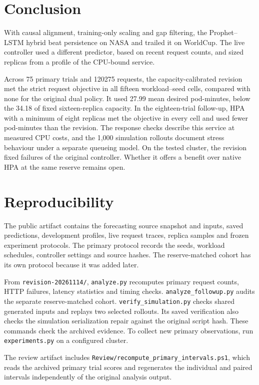 \documentclass[10pt,twocolumn,a4paper]{article}
\begin{document}
\section{Conclusion}
With causal alignment, training-only scaling and gap filtering, the Prophet--LSTM hybrid beat persistence on NASA and trailed it on WorldCup. The live controller used a different predictor, based on recent request counts, and sized replicas from a profile of the CPU-bound service.

Across 75 primary trials and 120275 requests, the capacity-calibrated revision met the strict request objective in all fifteen workload--seed cells, compared with none for the original dual policy. It used 27.99 mean desired pod-minutes, below the 34.18 of fixed sixteen-replica capacity. In the eighteen-trial follow-up, HPA with a minimum of eight replicas met the objective in every cell and used fewer pod-minutes than the revision. The response checks describe this service at measured CPU costs, and the 1,000 simulation rollouts document stress behaviour under a separate queueing model. On the tested cluster, the revision fixed failures of the original controller. Whether it offers a benefit over native HPA at the same reserve remains open.

\appendix
\section{Reproducibility}
The public artifact contains the forecasting source snapshot and inputs, saved predictions, development profiles, live request traces, replica samples and frozen experiment protocols. The primary protocol records the seeds, workload schedules, controller settings and source hashes. The reserve-matched cohort has its own protocol because it was added later.

From \texttt{revision-20261114/}, \texttt{analyze.py} recomputes primary request counts, HTTP failures, latency statistics and timing checks. \texttt{analyze\_followup.py} audits the separate reserve-matched cohort. \texttt{verify\_simulation.py} checks shared generated inputs and replays two selected rollouts. Its saved verification also checks the simulation serialization repair against the original script hash. These commands check the archived evidence. To collect new primary observations, run \texttt{experiments.py} on a configured cluster.

The review artifact includes \texttt{Review/recompute\_primary\_intervals.ps1}, which reads the archived primary trial scores and regenerates the individual and paired intervals independently of the original analysis output.
\end{document}
